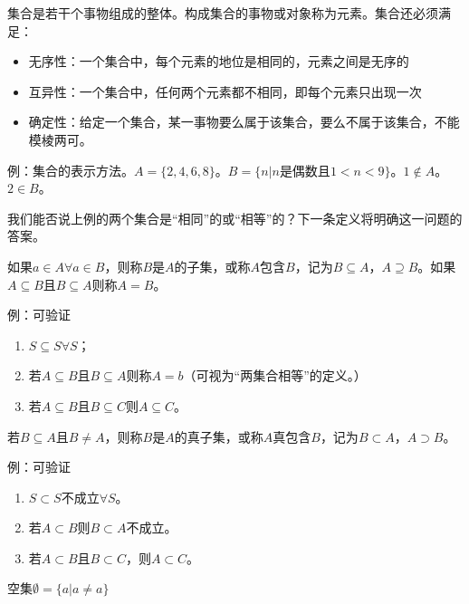 \documentclass[main.tex]{subfiles}
\begin{document}
\begin{definition}[集合]
集合是若干个事物组成的整体。构成集合的事物或对象称为元素。集合还必须满足：
\begin{itemize}
    \item 无序性：一个集合中，每个元素的地位是相同的，元素之间是无序的
    \item 互异性：一个集合中，任何两个元素都不相同，即每个元素只出现一次
    \item 确定性：给定一个集合，某一事物要么属于该集合，要么不属于该集合，不能模棱两可。
\end{itemize}
\end{definition}

例：集合的表示方法。\(A=\{2,4,6,8\}\)。\(B=\{n|n\text{是偶数且}1<n<9\}\)。\(1\notin A\)。\(2\in B\)。

我们能否说上例的两个集合是“相同”的或“相等”的？下一条定义将明确这一问题的答案。

\begin{definition}[子集、包含]
如果\(a\in A\forall a\in B\)，则称$B$是$A$的子集，或称$A$包含$B$，记为\(B\subseteq A\)，\(A\supseteq B\)。如果\(A\subseteq B\)且\(B\subseteq A\)则称\(A=B\)。
\end{definition}

例：可验证

\begin{enumerate}
\item \(S\subseteq S \forall S\)；
\item 若\(A\subseteq B\)且\(B\subseteq A\)则称\(A=b\)（可视为“两集合相等”的定义。）
\item 若\(A\subseteq B\)且\(B\subseteq C\)则\(A\subseteq C\)。
\end{enumerate}


\begin{definition}
若\(B\subseteq A\)且\(B\neq A\)，则称$B$是$A$的真子集，或称$A$真包含$B$，记为\(B\subset A\)，\(A\supset B\)。
\end{definition}

例：可验证

\begin{enumerate}
    \item $S\subset S$不成立$\forall S$。
    \item 若$A\subset B$则$B\subset A$不成立。
    \item 若$A\subset B$且$B\subset C$，则$A\subset C$。
\end{enumerate}


\begin{definition}[空集]
空集$\emptyset = \{a|a\neq a\}$
\end{definition}
\end{document}
